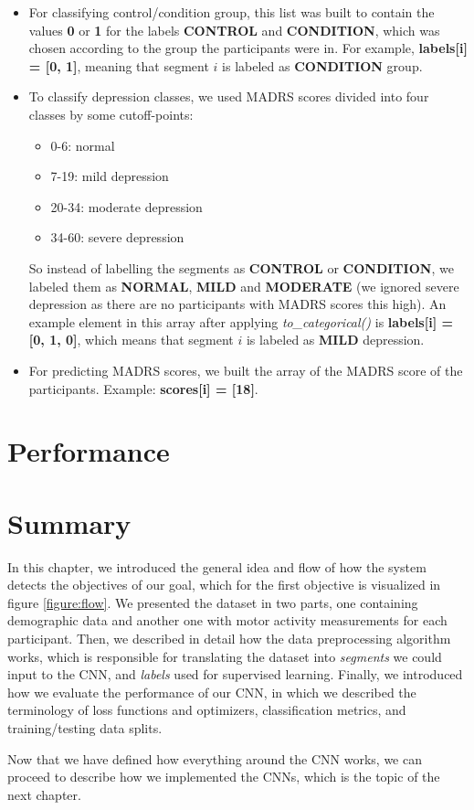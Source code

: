 \begin{itemize}
  \item For classifying control/condition group, this list was built to contain the values \textbf{0} or \textbf{1} for the labels \textbf{CONTROL} and \textbf{CONDITION}, which was chosen according to the group the participants were in. For example, \textbf{labels[i] = [0, 1]}, meaning that segment $i$ is labeled as \textbf{CONDITION} group. 
  
  \item To classify depression classes, we used MADRS scores divided into four classes by some cutoff-points:
  \begin{itemize}
    \item 0-6: normal
    \item 7-19: mild depression
    \item 20-34: moderate depression
    \item 34-60: severe depression
  \end{itemize}
  So instead of labelling the segments as \textbf{CONTROL} or \textbf{CONDITION}, we labeled them as \textbf{NORMAL}, \textbf{MILD} and \textbf{MODERATE} (we ignored severe depression as there are no participants with MADRS scores this high). An example element in this array after applying \textit{to\_categorical()} is \textbf{labels[i] = [0, 1, 0]}, which means that segment $i$ is labeled as \textbf{MILD} depression.
  \item For predicting MADRS scores, we built the array of the MADRS score of the participants. Example: \textbf{scores[i] = [18]}.
\end{itemize}

\section{Performance}



\section{Summary}
In this chapter, we introduced the general idea and flow of how the system detects the objectives of our goal, which for the first objective is visualized in figure \ref{figure:flow}. We presented the dataset in two parts, one containing demographic data and another one with motor activity measurements for each participant. Then, we described in detail how the data preprocessing algorithm works, which is responsible for translating the dataset into \textit{segments} we could input to the CNN, and \textit{labels} used for supervised learning. Finally, we introduced how we evaluate the performance of our CNN, in which we described the terminology of loss functions and optimizers, classification metrics, and training/testing data splits. 

Now that we have defined how everything around the CNN works, we can proceed to describe how we implemented the CNNs, which is the topic of the next chapter. 